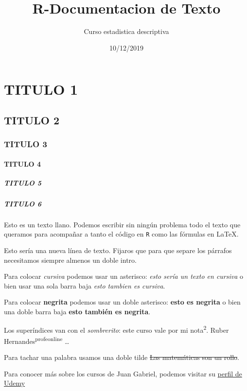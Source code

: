 \documentclass[]{article}
\title{R-Documentacion de Texto}
\author{Curso estadistica descriptiva}
\date{10/12/2019}
\let\oldparagraph\paragraph
\renewcommand{\paragraph}[1]{\oldparagraph{#1}\mbox{}}
\let\oldsubparagraph\subparagraph
\renewcommand{\subparagraph}[1]{\oldsubparagraph{#1}\mbox{}}
\begin{document}
\maketitle

\hypertarget{titulo-1}{%
\section{TITULO 1}\label{titulo-1}}

\hypertarget{titulo-2}{%
\subsection{TITULO 2}\label{titulo-2}}

\hypertarget{titulo-3}{%
\subsubsection{TITULO 3}\label{titulo-3}}

\hypertarget{titulo-4}{%
\paragraph{TITULO 4}\label{titulo-4}}

\hypertarget{titulo-5}{%
\subparagraph{TITULO 5}\label{titulo-5}}

\hypertarget{titulo-6}{%
\subparagraph{TITULO 6}\label{titulo-6}}

Esto es un texto llano. Podemos escribir sin ningún problema todo el
texto que queramos para acompañar a tanto el código en \texttt{R} como
las fórmulas en \LaTeX.

Esto sería una nueva línea de texto. Fijaros que para que separe los
párrafos necesitamos siempre almenos un doble intro.

Para colocar \emph{cursiva} podemos usar un asterisco: \emph{esto sería
un texto en cursiva} o bien usar una sola barra baja \emph{esto tambien
es cursiva}.

Para colocar \textbf{negrita} podemos usar un doble asterisco:
\textbf{esto es negrita} o bien una doble barra baja \textbf{esto
también es negrita}.

Los superíndices van con el \emph{sombrerito}: este curso vale por mi
nota\textsuperscript{2}. Ruber Hernandes\textsuperscript{profeonline}
\ldots{}

Para tachar una palabra usamos una doble tilde \sout{Las matemáticas son
un rollo}.

Para conocer más sobre los cursos de Juan Gabriel, podemos visitar su
\href{https://udemy.com/u/juangabriel}{perfil de Udemy}
\end{document}
